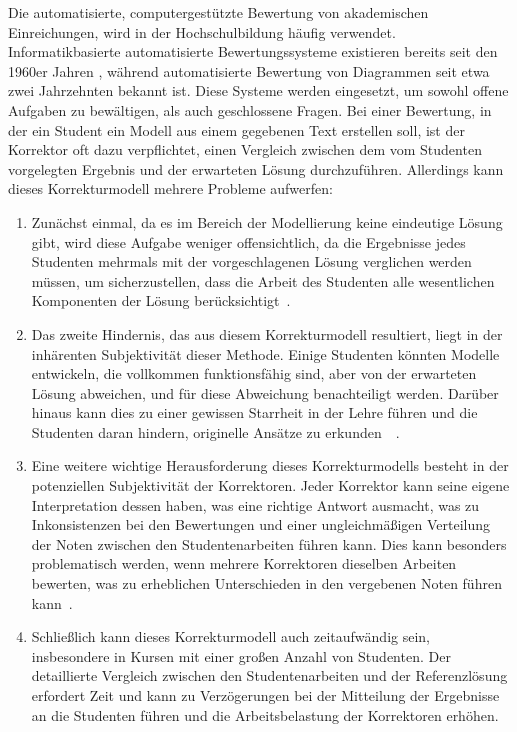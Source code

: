 Die automatisierte, computergestützte Bewertung von akademischen Einreichungen, wird in der Hochschulbildung häufig verwendet. Informatikbasierte automatisierte Bewertungssysteme existieren bereits seit den 1960er Jahren \cite{ullrich2021automated}, während automatisierte Bewertung von Diagrammen seit etwa zwei Jahrzehnten bekannt ist. Diese Systeme werden eingesetzt, um sowohl offene Aufgaben zu bewältigen, als auch geschlossene Fragen.  Bei einer Bewertung, in der ein Student ein Modell aus einem gegebenen Text erstellen soll, ist der Korrektor oft dazu verpflichtet, einen Vergleich zwischen dem vom Studenten vorgelegten Ergebnis und der erwarteten Lösung durchzuführen. Allerdings kann dieses Korrekturmodell mehrere Probleme aufwerfen:

\begin{enumerate}
    \item Zunächst einmal, da es im Bereich der Modellierung keine eindeutige Lösung gibt, wird diese Aufgabe weniger offensichtlich, da die Ergebnisse jedes Studenten mehrmals mit der vorgeschlagenen Lösung verglichen werden müssen, um sicherzustellen, dass die Arbeit des Studenten alle wesentlichen Komponenten der Lösung berücksichtigt~\cite{geer1988open}.
    \item Das zweite Hindernis, das aus diesem Korrekturmodell resultiert, liegt in der inhärenten Subjektivität dieser Methode. Einige Studenten könnten Modelle entwickeln, die vollkommen funktionsfähig sind, aber von der erwarteten Lösung abweichen, und für diese Abweichung benachteiligt werden. Darüber hinaus kann dies zu einer gewissen Starrheit in der Lehre führen und die Studenten daran hindern, originelle Ansätze zu erkunden~\cite{mccann2010factors}~\cite{hancock1995implementing}.
    \item Eine weitere wichtige Herausforderung dieses Korrekturmodells besteht in der potenziellen Subjektivität der Korrektoren. Jeder Korrektor kann seine eigene Interpretation dessen haben, was eine richtige Antwort ausmacht, was zu Inkonsistenzen bei den Bewertungen und einer ungleichmäßigen Verteilung der Noten zwischen den Studentenarbeiten führen kann. Dies kann besonders problematisch werden, wenn mehrere Korrektoren dieselben Arbeiten bewerten, was zu erheblichen Unterschieden in den vergebenen Noten führen kann~\cite{mccann2010factors}.
    \item Schließlich kann dieses Korrekturmodell auch zeitaufwändig sein, insbesondere in Kursen mit einer großen Anzahl von Studenten. Der detaillierte Vergleich zwischen den Studentenarbeiten und der Referenzlösung erfordert Zeit und kann zu Verzögerungen bei der Mitteilung der Ergebnisse an die Studenten führen und die Arbeitsbelastung der Korrektoren erhöhen.
\end{enumerate}

